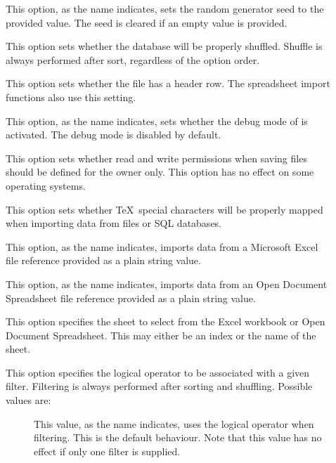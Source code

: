 \begin{description}
\begin{description}
\item[] This option, as the name indicates, sets the random generator seed to the provided value. The seed is cleared if an empty value is provided.

\item[] This option sets whether the database will be properly shuffled. Shuffle is always performed after sort, regardless of the option order.

\item[] This option sets whether the  file has a header row. The
spreadsheet import functions also use this setting.

\item[] This option, as the name indicates, sets whether the debug mode of  is activated. The debug mode is disabled by default.

\item[] This option sets whether read and write permissions when saving  files should be defined for the owner only. This option has no effect on some operating systems.

\item[] This option sets whether \TeX\ special characters will be properly mapped when importing data from  files or SQL databases.

\item[] This option, as the name indicates, imports data from a Microsoft Excel  file reference provided as a plain string value.

\item[] This option, as the name indicates, imports data from an Open Document Spreadsheet  file reference provided as a plain string value.

\item[] This option specifies the sheet to select from the Excel workbook or Open Document Spreadsheet. This may either be an index or the name of the sheet.

\item[] This option specifies the logical operator to be associated with a given filter. Filtering is always performed after sorting and shuffling. Possible values are:

\begin{description}
\item[\hfill\hphantom{w}] This value, as the name indicates, uses the logical  operator when filtering. This is the default behaviour. Note that this value has no effect if only one filter is supplied.


\end{description}
\end{description}
\end{description}
